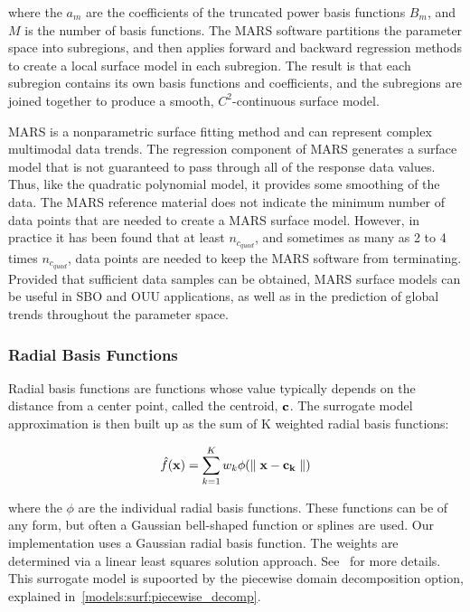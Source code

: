 where the $a_{m}$ are the coefficients of the truncated power basis
functions $B_{m}$, and $M$ is the number of basis functions. The MARS
software partitions the parameter space into subregions, and then
applies forward and backward regression methods to create a local
surface model in each subregion. The result is that each subregion
contains its own basis functions and coefficients, and the subregions
are joined together to produce a smooth, $C^{2}$-continuous surface
model.

MARS is a nonparametric surface fitting method and can represent
complex multimodal data trends. The regression component of MARS
generates a surface model that is not guaranteed to pass through all
of the response data values. Thus, like the quadratic polynomial
model, it provides some smoothing of the data. The MARS reference
material does not indicate the minimum number of data points that are
needed to create a MARS surface model. However, in practice it has
been found that at least $n_{c_{quad}}$, and sometimes as many as 2 to
4 times $n_{c_{quad}}$, data points are needed to keep the MARS
software from terminating.  Provided that sufficient data samples can
be obtained, MARS surface models can be useful in SBO and OUU
applications, as well as in the prediction of global trends throughout
the parameter space.

\subsubsection{Radial Basis Functions}\label{models:surf:rbf}

Radial basis functions are functions whose value typically depends on the 
distance from a center point, called the centroid, ${\bf c}$. 
The surrogate model approximation is then built up as the sum of K 
weighted radial basis functions: 

\begin{equation}
  \hat{f}({\bf x})=\sum_{k=1}^{K}w_{k}\phi({\parallel {\bf x} - {\bf c_{k}} \parallel})
  \label{models:surf:equation11}  
\end{equation}

where the $\phi$ are the individual radial basis functions.  
These functions can be of any form, but often a Gaussian bell-shaped 
function or splines are used.  
Our implementation uses a Gaussian radial basis function. 
The weights are determined via a linear least squares solution approach.
See~\cite{Orr96} for more details.
This surrogate model is supoorted by the piecewise domain decomposition option, explained in~\ref{models:surf:piecewise_decomp}.

